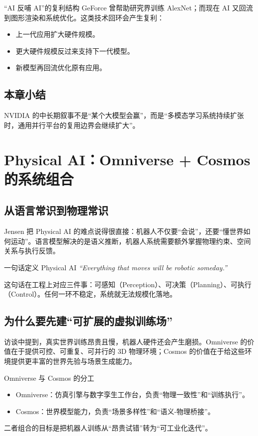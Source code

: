 \documentclass[a4paper]{article}
\begin{document}
\begin{knowledgebox}{“AI 反哺 AI”的复利结构}
GeForce 曾帮助研究界训练 AlexNet；而现在 AI 又回流到图形渲染和系统优化。这类技术回环会产生复利：
\begin{itemize}
    \item 上一代应用扩大硬件规模。
    \item 更大硬件规模反过来支持下一代模型。
    \item 新模型再回流优化原有应用。
\end{itemize}
\end{knowledgebox}

\subsection{本章小结}
NVIDIA 的中长期叙事不是“某个大模型会赢”，而是“多模态学习系统持续扩张时，通用并行平台的复用边界会继续扩大”。

\section{Physical AI：Omniverse + Cosmos 的系统组合}

\subsection{从语言常识到物理常识}

Jensen 把 Physical AI 的难点说得很直接：机器人不仅要“会说”，还要“懂世界如何运动”。语言模型解决的是语义推断，机器人系统需要额外掌握物理约束、空间关系与执行反馈。

\begin{importantbox}{一句话定义 Physical AI}
\textit{``Everything that moves will be robotic someday.''}

这句话在工程上对应三件事：可感知（Perception）、可决策（Planning）、可执行（Control）。任何一环不稳定，系统就无法规模化落地。
\end{importantbox}

\subsection{为什么要先建“可扩展的虚拟训练场”}

访谈中提到，真实世界训练昂贵且慢，机器人硬件还会产生磨损。Omniverse 的价值在于提供可控、可重复、可并行的 3D 物理环境；Cosmos 的价值在于给这些环境提供更丰富的世界先验与场景生成能力。

\begin{knowledgebox}{Omniverse 与 Cosmos 的分工}
\begin{itemize}
    \item Omniverse：仿真引擎与数字孪生工作台，负责“物理一致性”和“训练执行”。
    \item Cosmos：世界模型能力，负责“场景多样性”和“语义-物理桥接”。
\end{itemize}
二者组合的目标是把机器人训练从“昂贵试错”转为“可工业化迭代”。
\end{knowledgebox}
\end{document}
